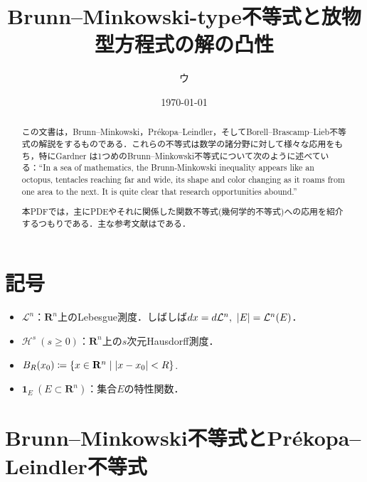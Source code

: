 \documentclass[a4j]{ltjsarticle}
\newcommand{\Rset}{\mathbf{R}}
\newcommand{\Lm}{\mathcal{L}}
\newcommand{\Hm}{\mathcal{H}}
\newcommand{\1}{\bm{1}}
\numberwithin{equation}{section}
\theoremstyle{definition}
\begin{document}
\title{Brunn--Minkowski-type不等式と放物型方程式の解の凸性}
\author{ウ}
\date{\today}
\maketitle
\begin{abstract}
    この文書は，Brunn--Minkowski，Pr\'ekopa--Leindler，そしてBorell--Brascamp--Lieb不等式の解説をするものである．これらの不等式は数学の諸分野に対して様々な応用をもち，特にGardner \cite{G}は1つめのBrunn--Minkowski不等式について次のように述べている：``In a sea of mathematics, the Brunn-Minkowski inequality appears like an octopus, tentacles reaching far and wide, its shape and color changing as it roams from one area to the next. It is quite clear that research opportunities abound.'' 

    本PDFでは，主にPDEやそれに関係した関数不等式(幾何学的不等式)への応用を紹介するつもりである．主な参考文献は\cites{BL,G,ILS}である．
\end{abstract}
\tableofcontents
\section*{記号}
\begin{itemize}
    \item $\Lm^n$：$\Rset^n$上のLebesgue測度．しばしば$dx=d\Lm^n,\ \abs{E}=\Lm^n(E)$．
    \item $\Hm^s\ (s\geq0)$：$\Rset^n$上の$s$次元Hausdorff測度．
    \item $B_R(x_0)\coloneqq \qty{x\in \Rset^n \mid \abs{x-x_0}<R}$.
    \item $\1_E\ (E\subset \Rset^n)$：集合$E$の特性関数．
\end{itemize}
\section{Brunn--Minkowski不等式とPr\'ekopa--Leindler不等式}
\end{document}
